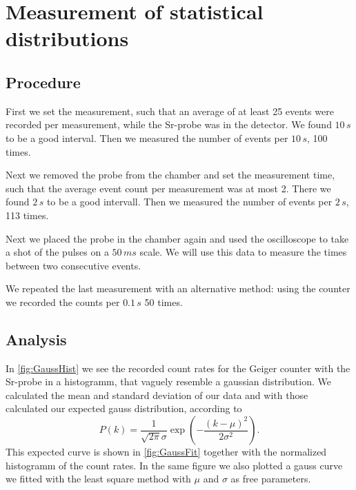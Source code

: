\section{Measurement of statistical distributions}

\subsection{Procedure}

First we set the measurement, such that an average of at least 25 events were recorded per measurement, while the Sr-probe was in the detector. We found $10\,s$ to be a good interval. Then we measured the number of events per $10\,s$, 100 times.

Next we removed the probe from the chamber and set the measurement time, such that the average event count per measurement was at most 2. There we found $2\,s$ to be a good intervall. Then we measured the number of events per $2\,s$, 113 times.

Next we placed the probe in the chamber again and used the oscilloscope to take a shot of the pulses on a $50\,ms$ scale. We will use this data to measure the times between two consecutive events.

We repeated the last measurement with an alternative method: using the counter we recorded the counts per $0.1\,s$ 50 times.

\subsection{Analysis}

In \cref{fig:GaussHist} we see the recorded count rates for the Geiger counter with the Sr-probe in a histogramm, that vaguely resemble a gaussian distribution. We calculated the mean and standard deviation of our data and with those calculated our expected gauss distribution, according to
\begin{equation}
P(k) = \frac{1}{\sqrt{2\pi}\sigma} \exp(-\frac{(k-\mu)^2}{2\sigma^2}).
\end{equation}
This expected curve is shown in \cref{fig:GaussFit} together with the normalized histogramm of the count rates. In the same figure we also plotted a gauss curve we fitted with the least square method with $\mu$ and $\sigma$ as free parameters.

